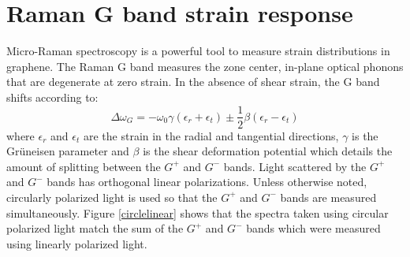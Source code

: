 \section{Raman G band strain response}
Micro-Raman spectroscopy is a powerful tool to measure strain distributions in graphene.  The Raman G band measures the zone center, in-plane optical phonons that are degenerate at zero strain.  In the absence of shear strain, the G band shifts according to\cite{Huang2009}:
\begin{equation}
\Delta \omega_G=-\omega_0 \gamma(\epsilon_{r}+\epsilon_{t}) \pm \frac{1}{2} \beta (\epsilon_{r}-\epsilon_{t})
\end{equation}
where $\epsilon_{r}$ and $\epsilon_{t}$ are the strain in the radial and tangential directions,  $\gamma$ is the Gr\"{u}neisen parameter and $\beta$ is the shear deformation potential which details the amount of splitting between the $G^+$ and $G^-$ bands.  Light scattered by the $G^+$ and $G^-$  bands has orthogonal linear polarizations\cite{Huang2009}.  Unless otherwise noted, circularly polarized light is used so that the $G^+$ and $G^-$ bands are measured simultaneously.  Figure \ref{circlelinear} shows that the spectra taken using circular polarized light match the sum of the $G^+$ and $G^-$ bands which were measured using linearly polarized light.


